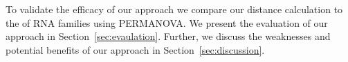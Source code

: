 To validate the efficacy of our approach we compare our distance calculation to the \clique{} of RNA families using PERMANOVA.
We present the evaluation of our approach in Section~\ref{sec:evaulation}.
Further, we discuss the weaknesses and potential benefits of our approach in Section~\ref{sec:discussion}.

